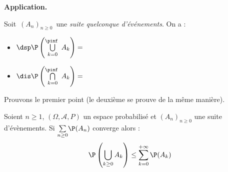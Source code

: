 \documentclass[a4paper,10pt]{report}
\newcommand{\Sum}[2]{\ensuremath{\textstyle{\sum\limits_{#1}^{#2}}}}
\begin{document}
\medskip

%
%
 
\noindent \textbf{Application.}

\noindent Soit $\,(A_n)_{n \geq 0}\,$ une \textit{suite quelconque d'événements}. On a :
\begin{itemize}
\item $\dsp\P \left(\bigcup\limits_{k=0}^{\pinf\ } A_k\right) = \phantom{
\lim\limits_{n\to\pinf}\!\!\P\left(\bigcup\limits_{k=0}^{n} A_k\right) 
\quad}$ 
\item $\dis \P \left(\bigcap\limits_{k=0}^{\pinf\ } A_k\right) = 
\phantom{\lim\limits_{n\to\pinf}\!\!\P\left(\bigcap\limits_{k=0}^{n} A_k\right)} $
\end{itemize}

\medskip

\noindent Prouvons le premier point (le deuxième se prouve de la même manière).

\vspace{7cm}


\begin{thm}
Soient $n \geq 1$, $(\Omega,\mathcal{A},P)$ un espace probabilisé et $(A_n)_{n \geq 0}$ une suite d'évènements. Si $\Sum{n \geq 0}{} \P(A_n)$ converge alors :
$$ \P \left(\bigcup_{k \geq 0} A_k \right) \leq \sum_{k=0}^{+ \infty} \P(A_k)$$
\end{thm}
\end{document}
